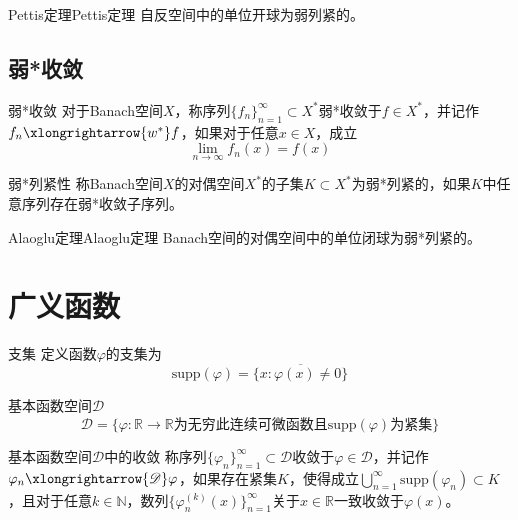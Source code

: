 \documentclass[lang = cn, scheme = chinese, thmcnt = section]{elegantbook}
\newcommand{\N}{\mathbb{N}}            %
\newcommand{\R}{\mathbb{R}}            %
\newcommand{\sub}{\subset}             %
\newcommand{\dis}{\displaystyle}
\newcommand{\toD}{\xlongrightarrow{\mathscr{D}}}
\begin{document}
\begin{theorem}{Pettis定理}{Pettis定理}
	自反空间中的单位开球为弱列紧的。
\end{theorem}

\section{弱*收敛}

\begin{definition}{弱*收敛}
	对于Banach空间$X$，称序列$\{f_n\}_{n=1}^{\infty}\sub X^*$弱*收敛于$f\in X^*$，并记作$f_n\xlongrightarrow{w^*}f$，如果对于任意$x\in X$，成立
	$$
	\lim_{n\to\infty}f_n(x)=f(x)
	$$
\end{definition}

\begin{definition}{弱*列紧性}
	称Banach空间$X$的对偶空间$X^*$的子集$K\sub X^*$为弱*列紧的，如果$K$中任意序列存在弱*收敛子序列。
\end{definition}

\begin{theorem}{Alaoglu定理}{Alaoglu定理}
	Banach空间的对偶空间中的单位闭球为弱*列紧的。
\end{theorem}

\chapter{广义函数}

\begin{definition}{支集}
	定义函数$\varphi$的支集为%
	$$
	\text{supp}(\varphi)=\overline{\{ x:\varphi(x)\ne 0 \}}
	$$
\end{definition}

\begin{definition}{基本函数空间$\mathscr{D}$}
	$$
	\mathscr{D}=\{ \varphi:\R\to\R\text{为无穷此连续可微函数且}\text{supp}(\varphi)\text{为紧集} \}
	$$
\end{definition}

\begin{definition}{基本函数空间$\mathscr{D}$中的收敛}
	称序列$\{ \varphi_n \}_{n=1}^{\infty}\sub\mathscr{D}$收敛于$\varphi\in \mathscr{D}$，并记作$\varphi_n\toD \varphi$，如果存在紧集$K$，使得成立$\dis\bigcup_{n=1}^{\infty}\text{supp}(\varphi_n)\sub K$，且对于任意$k\in\N$，数列$\{ \varphi_n^{(k)}(x) \}_{n=1}^{\infty}$关于$x\in\R$一致收敛于$\varphi(x)$。
\end{definition}
\end{document}
